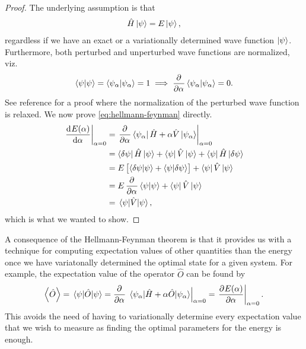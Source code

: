         \begin{proof}
            The underlying assumption is that
            \begin{align}
                \hat{H}\ket{\psi} = E\ket{\psi},
            \end{align}
            regardless if we have an exact or a variationally determined wave
            function $\ket{\psi}$.
            Furthermore, both perturbed and unperturbed wave functions are
            normalized, viz.
            \begin{align}
                \braket{\psi}{\psi} = \braket{\psi_{\alpha}}{\psi_{\alpha}} = 1
                \implies
                \dpd[]{}{\alpha} \braket{\psi_{\alpha}}{\psi_{\alpha}} = 0.
            \end{align}
            See reference \cite{helgaker-molecular} for a proof where the
            normalization of the perturbed wave function is relaxed.
            We now prove \autoref{eq:hellmann-feynman} directly.
            \begin{align}
                \left.\dod[]{E(\alpha)}{\alpha}\right\rvert_{\alpha = 0}
                &=
                \left.
                \dpd[]{}{\alpha}
                \bra{\psi_{\alpha}}\hamil + \alpha\hat{V}\ket{\psi_{\alpha}}
                \right\rvert_{\alpha = 0}
                \\
                &=
                \bra{\delta\psi}\hamil\ket{\psi}
                + \bra{\psi}\hat{V}\ket{\psi}
                + \bra{\psi}\hamil\ket{\delta\psi}
                \\
                &=
                \energy \brak{
                    \braket{\delta\psi}{\psi}
                    + \braket{\psi}{\delta\psi}
                }
                + \bra{\psi}\hat{V}\ket{\psi}
                \\
                &=
                \energy \dpd[]{}{\alpha}\braket{\psi}{\psi}
                + \bra{\psi}\hat{V}\ket{\psi}
                \\
                &=
                \mel{\psi}{\hat{V}}{\psi},
            \end{align}
            which is what we wanted to show.
        \end{proof}
        A consequence of the Hellmann-Feynman theorem is that it provides us
        with a technique for computing expectation values of other quantities
        than the energy once we have variatonally determined the optimal state
        for a given system.
        For example, the expectation value of the operator $\hat{O}$ can be
        found by
        \begin{align}
            \expv{\hat{O}}
            = \mel{\psi}{\hat{O}}{\psi}
            = \dpd[]{}{\alpha}
            \left.
            \mel{\psi_{\alpha}}{\hamil + \alpha\hat{O}}{\psi_{\alpha}}
            \right\rvert_{\alpha = 0}
            =
            \left.
            \dpd[]{E(\alpha)}{\alpha}
            \right\rvert_{\alpha = 0}.
        \end{align}
        This avoids the need of having to variationally determine every
        expectation value that we wish to measure as finding the optimal
        parameters for the energy is enough.


